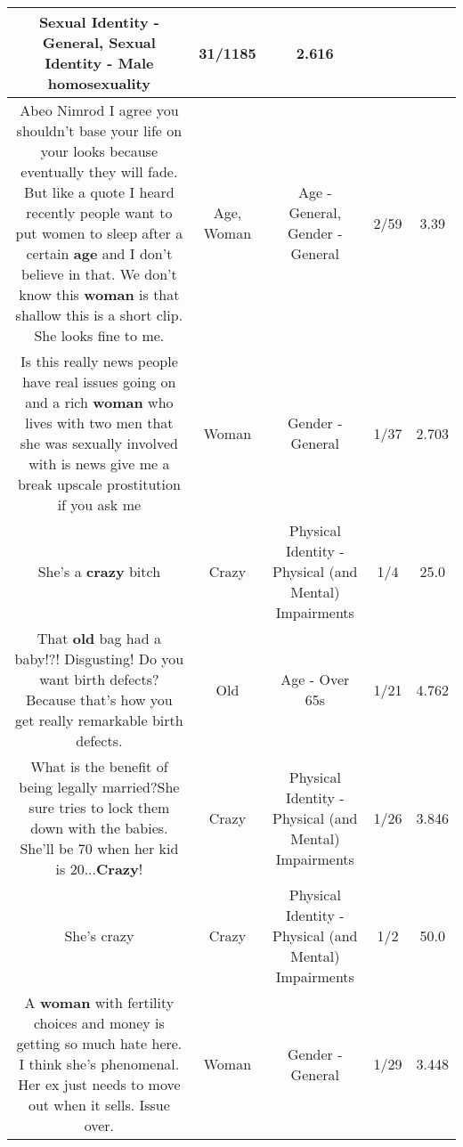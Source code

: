 \documentclass[11pt]{article}
\newlength\mylength
\begin{document}
\begin{center}
\begin{longtable}{|C{.65\mylength}|C{.30\mylength}|C{.12\mylength}|C{.12\mylength}|C{.12\mylength}|}
Sexual Identity - General, Sexual Identity - Male homosexuality & 31/1185 & 2.616 \\  \hline
  \small Abeo Nimrod I agree you shouldn't base your life on your looks because eventually they will fade. But like a quote I heard recently people want to put women to sleep after a certain \textbf{age} and I don't believe in that. We don't know this \textbf{woman} is that shallow this is a short clip. She looks fine to me.\normalsize   & Age, Woman & Age - General, Gender - General & 2/59 & 3.39 \\  \hline
  \small Is this really news people have real issues going on and a rich \textbf{woman} who lives with two men that she was sexually involved with is news give me a break upscale prostitution if you ask me\normalsize   & Woman & Gender - General & 1/37 & 2.703 \\  \hline
  \small She's a \textbf{crazy} bitch\normalsize   & Crazy & Physical Identity - Physical (and Mental) Impairments & 1/4 & 25.0 \\  \hline
  \small That \textbf{old} bag had a baby!?! Disgusting! Do you want birth defects? Because that's how you get really remarkable birth defects.\normalsize   & Old & Age - Over 65s & 1/21 & 4.762 \\  \hline
  \small What is the benefit of being legally married?She sure tries to lock them down with the babies. She'll be 70 when her kid is 20...\textbf{Crazy}!\normalsize   & Crazy & Physical Identity - Physical (and Mental) Impairments & 1/26 & 3.846 \\  \hline
  \small She's crazy\normalsize   & Crazy & Physical Identity - Physical (and Mental) Impairments & 1/2 & 50.0 \\  \hline
  \small A \textbf{woman} with fertility choices and money is getting so much hate here.  I think she's phenomenal.  Her ex just needs to move out when it sells.  Issue over.\normalsize   & Woman & Gender - General & 1/29 & 3.448 \\  \hline

\end{longtable}
\end{center}
\end{document}
